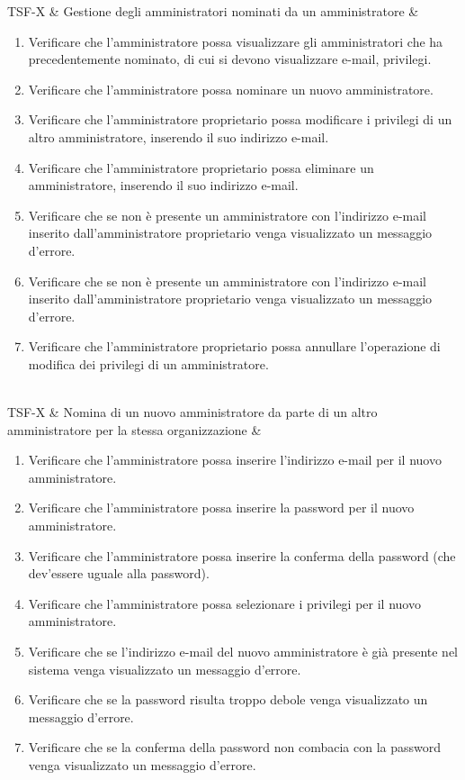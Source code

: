 TSF-X & Gestione degli amministratori nominati da un amministratore & \begin{enumerate}
    \item Verificare che l'amministratore possa visualizzare gli amministratori che ha precedentemente nominato, di cui si devono visualizzare e-mail, privilegi.
    \item Verificare che l'amministratore possa nominare un nuovo amministratore.
    \item Verificare che l'amministratore proprietario possa modificare i privilegi di un altro amministratore, inserendo il suo indirizzo e-mail.
    \item Verificare che l'amministratore proprietario possa eliminare un amministratore, inserendo il suo indirizzo e-mail.
    \item Verificare che se non è presente un amministratore con l'indirizzo e-mail inserito dall'amministratore proprietario venga visualizzato un messaggio d'errore.
    \item Verificare che se non è presente un amministratore con l'indirizzo e-mail inserito dall'amministratore proprietario venga visualizzato un messaggio d'errore.
    \item Verificare che l'amministratore proprietario possa annullare l'operazione di modifica dei privilegi di un amministratore.
\end{enumerate} \\

TSF-X & Nomina di un nuovo amministratore da parte di un altro amministratore per la stessa organizzazione & \begin{enumerate}
    \item Verificare che l'amministratore possa inserire l'indirizzo e-mail per il nuovo amministratore.
    \item Verificare che l'amministratore possa inserire la password per il nuovo amministratore.
    \item Verificare che l'amministratore possa inserire la conferma della password (che dev'essere uguale alla password).
    \item Verificare che l'amministratore possa selezionare i privilegi per il nuovo amministratore.
    \item Verificare che se l'indirizzo e-mail del nuovo amministratore è già presente nel sistema venga visualizzato un messaggio d'errore.
    \item Verificare che se la password risulta troppo debole venga visualizzato un messaggio d'errore.
    \item Verificare che se la conferma della password non combacia con la password venga visualizzato un messaggio d'errore.
\end{enumerate} \\
